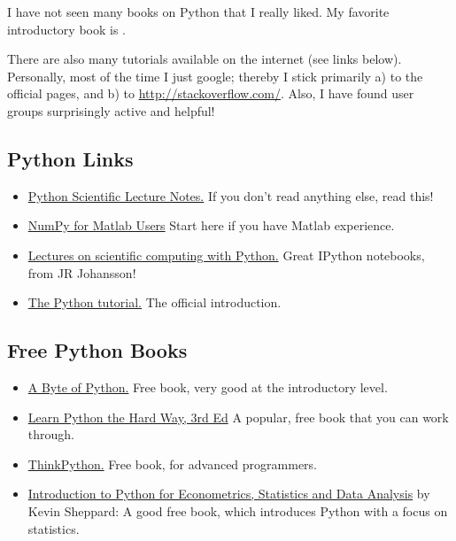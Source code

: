 I have not seen many books on Python that I really liked. My favorite introductory book is \cite{Harms2010}.

There are also many tutorials available on the internet (see links below). Personally, most of the time I just google; thereby I stick primarily a) to the official pages, and b) to \url{http://stackoverflow.com/}. Also, I have found user groups surprisingly active and helpful!

\subsection{Python Links}

\begin{itemize}
  \item  \href{http://scipy-lectures.github.com}{Python Scientific Lecture Notes.} If you don't read anything else, read this!
  \item \href{http://www.scipy.org/NumPy\_for\_Matlab\_Users}{NumPy for Matlab Users} Start here if you have Matlab experience.
  \item \href{https://github.com/jrjohansson/scientific-python-lectures}{Lectures on scientific computing with Python.} Great IPython notebooks, from JR Johansson!
  \item \href{http://docs.python.org/2/tutorial}{The Python tutorial.} The official introduction.
\end{itemize}

\subsection{Free Python Books}

\begin{itemize}
  \item \href{http://swaroopch.com/notes/python}{A Byte of Python.} Free book, very good at the introductory level.
  \item \href{http://learnpythonthehardway.org/book/}{Learn Python the Hard Way, 3rd Ed} A popular, free book that you can work through.
  \item \href{http://www.greenteapress.com/thinkpython}{ThinkPython.} Free book, for advanced programmers.
  \item \href{http://www.kevinsheppard.com/images/0/09/Python_introduction.pdf}{Introduction to
      Python for Econometrics, Statistics and Data Analysis} by Kevin Sheppard: A
      good free book, which introduces Python with a focus on statistics.
\end{itemize}

